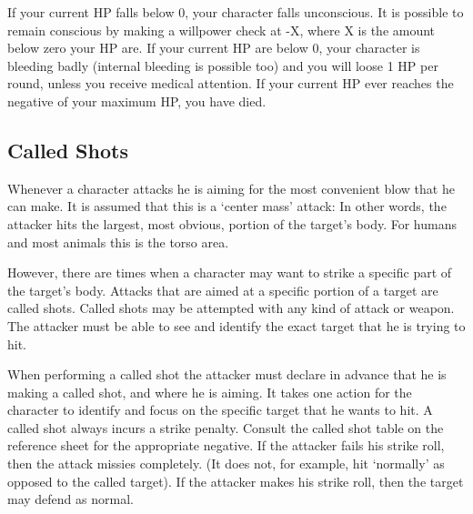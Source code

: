 \documentclass[twoside]{book}
\begin{document}
    {  
     If your current HP falls below 0, your character
               falls unconscious. It is possible to remain conscious by
               making a willpower check at -X, where X is the amount
               below zero your HP are. If your current HP are below 0,
               your character is bleeding badly (internal bleeding is
               possible too) and you will loose 1 HP per round, unless
               you receive medical attention. If your current HP ever
               reaches the negative of your maximum HP, you have died.
               
    }
  
    

\subsection{Called Shots}
    
    {  
      Whenever a character attacks he is aiming for the
               most convenient blow that he can make. It is assumed that
               this is a `center mass' attack: In other
               words, the attacker hits the largest, most obvious,
               portion of the target's body. For humans and most
               animals this is the torso area. 
    }
  
    {  
      However, there are times when a character may want
               to strike a specific part of the target's body.
               Attacks that are aimed at a specific portion of a target
               are called shots. Called shots may be attempted with any
               kind of attack or weapon. The attacker must be able to see
               and identify the exact target that he is trying to hit.
               
    }
  
    {  
      When performing a called shot the attacker must
               declare in advance that he is making a called shot, and
               where he is aiming. It takes one action for the character
               to identify and focus on the specific target that he wants
               to hit. A called shot always incurs a strike penalty.
               Consult the called shot table on the reference sheet for
               the appropriate negative. If the attacker fails his strike
               roll, then the attack missies completely. (It does not,
               for example, hit `normally' as opposed to the
               called target). If the attacker makes his strike roll,
               then the target may defend as normal. 
    }
  
\end{document}
